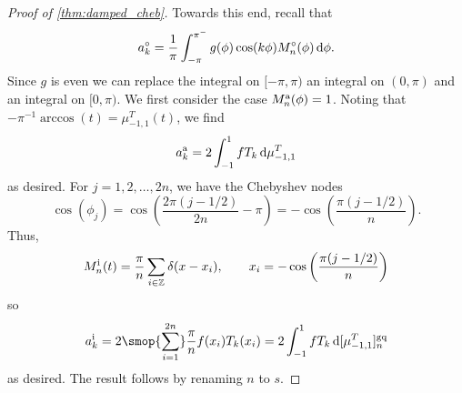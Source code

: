 \begin{proof}[Proof of \cref{thm:damped_cheb}]
    Towards this end, recall that
    \begin{equation*}
        a_k^\circ 
        = \frac{1}{\pi} \int_{-\pi}^{\pi^-}g(\phi) \cos(k\phi)M_n^\circ(\phi) \,\textup{d}\phi.
    \end{equation*}
    Since \( g \) is even we can replace the integral on \( [-\pi,\pi) \) an integral on \( (0,\pi) \) and an integral on \( [0,\pi) \).
    We first consider the case \( M_n^{\textup{a}}(\phi) = 1 \).
    Noting that \( - \pi^{-1}  \arccos(t) = \mu_{-1,1}^T(t) \), we find
    \begin{equation*}
        a_k^\textup{a} = 2 \int_{-1}^{1} f T_k \,\textup{d} \mu_{-1,1}^T
    \end{equation*}
    as desired.
    For \( j=1,2,\ldots, 2n \), we have the Chebyshev nodes
    \begin{equation*}
        \cos(\phi_j) 
        = \cos \left( \frac{2\pi (j-1/2)}{2n} - \pi \right)
        = - \cos \left( \frac{\pi (j-1/2)}{n}\right).
    \end{equation*}
    Thus,
    \begin{equation*}
        M_n^\textup{i}(t) = \frac{\pi}{n} \sum_{i\in \mathbb{Z}}  \delta(x-x_i)
        ,\qquad x_i = - \cos \left( \frac{\pi (j-1/2)}{n}\right)
    \end{equation*}
    so
    \begin{equation*}
        a_k^\textup{i} = 2 \smop{\sum_{i=1}^{2n}} \frac{\pi}{n} f(x_i) T_k(x_i)
        = 2 \int_{-1}^{1} f T_k \,\d \qq[g]{\mu_{-1,1}^T}{n}
    \end{equation*}
    as desired.    
    The result follows by renaming \( n \) to \( s \).
\end{proof}



